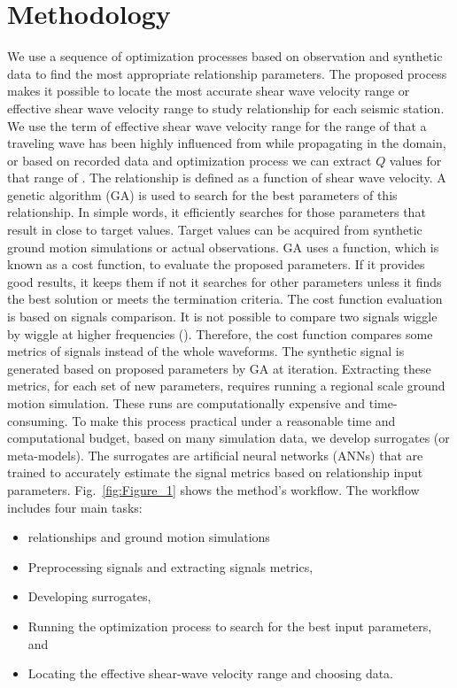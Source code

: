 \section{Methodology}

We use a sequence of optimization processes based on observation and synthetic data to find the most appropriate \qsvs{} relationship parameters. The proposed process makes it possible to locate the most accurate shear wave velocity range or effective shear wave velocity range to study \qsvs{} relationship for each seismic station. We use the term of effective shear wave velocity range for the range of \vs{} that a traveling wave has been highly influenced from while propagating in the domain, or based on recorded data and optimization process we can extract $Q$ values for that range of \vs{}. The \qsvs{} relationship is defined as a function of shear wave velocity.  A genetic algorithm (GA) is used to search for the best parameters of this relationship.  In simple words, it efficiently searches for those parameters that result in close to target values. Target values can be acquired from synthetic ground motion simulations or actual observations. GA uses a function, which is known as a cost function, to evaluate the proposed parameters. If it provides good results, it keeps them if not it searches for other parameters unless it finds the best solution or meets the termination criteria. The cost function evaluation is based on signals comparison. It is not possible to compare two signals wiggle by wiggle at higher frequencies (). Therefore, the cost function compares some metrics of signals instead of the whole waveforms.  The synthetic signal is generated based on proposed parameters by GA at iteration. Extracting these metrics, for each set of new parameters, requires running a regional scale ground motion simulation. These runs are computationally expensive and time-consuming. To make this process practical under a reasonable time and computational budget, based on many simulation data, we develop surrogates (or meta-models).  The surrogates are artificial neural networks (ANNs) that are trained to accurately estimate the signal metrics based on \qsvs{} relationship input parameters. Fig.~\ref{fig:Figure_1} shows the method's workflow. The workflow includes four main tasks:
\begin{itemize}
        \item \qsvs{} relationships and ground motion simulations 
	\item Preprocessing signals and extracting signals metrics,
	\item Developing surrogates, 
	\item Running the optimization process to search for the best input parameters, and
	\item Locating the effective shear-wave velocity range and choosing data.  
\end{itemize}

